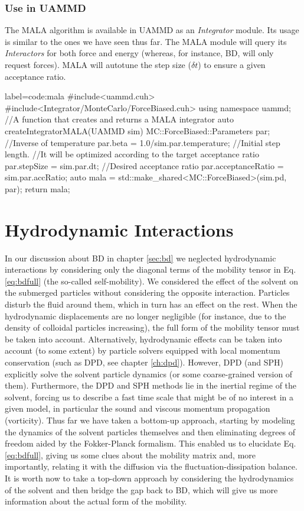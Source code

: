 \documentclass[twoside,openright,titlepage,numbers=noenddot,%
headinclude,footinclude,cleardoublepage=empty,abstract=on,
BCOR=5mm,fontsize=11pt, dvipsnames, paper=b5
]{scrreprt}
\newcommand{\uammd}{\gls{UAMMD}\xspace}
\newcommand{\dt}{\delta t}
\begin{document}
\subsection*{Use in UAMMD}
The MALA algorithm is available in \uammd as an \emph{Integrator} module. Its usage is similar to the ones we have seen thus far. The MALA module will query its \emph{Interactors} for both force and energy (whereas, for instance, \gls{BD}, will only request forces).
MALA will autotune the step size ($\dt$) to ensure a given acceptance ratio.
\begin{code2}{label=code:mala}
#include<uammd.cuh>
#include<Integrator/MonteCarlo/ForceBiased.cuh>
using namespace uammd;
//A function that creates and returns a MALA integrator
auto createIntegratorMALA(UAMMD sim){   
  MC::ForceBiased::Parameters par;
  //Inverse of temperature
  par.beta = 1.0/sim.par.temperature;	
  //Initial step length.
  //It will be optimized according to the target acceptance ratio
  par.stepSize = sim.par.dt;
  //Desired acceptance ratio 
  par.acceptanceRatio = sim.par.accRatio;
  auto mala = std::make_shared<MC::ForceBiased>(sim.pd, par);
  return mala;
}
\end{code2}

\chapter{Hydrodynamic Interactions}\label{sec:bdhi}
In our discussion about \gls{BD} in chapter \ref{sec:bd} we neglected hydrodynamic interactions by considering only the diagonal terms of the mobility tensor in Eq. \eqref{eq:bdfull} (the so-called self-mobility). We considered the effect of the solvent on the submerged particles without considering the opposite interaction. Particles disturb the fluid around them, which in turn has an effect on the rest. When the hydrodynamic displacements are no longer negligible (for instance, due to the density of colloidal particles increasing), the full form of the mobility tensor must be taken into account. Alternatively, hydrodynamic effects can be taken into account (to some extent) by particle solvers equipped with local momentum conservation (such as \gls{DPD}, see chapter \ref{ch:dpd}). However, \gls{DPD} (and \gls{SPH}) explicitly solve the solvent particle dynamics (or some coarse-grained version of them). Furthermore, the \gls{DPD} and \gls{SPH} methods lie in the inertial regime of the solvent, forcing us to describe a fast time scale that might be of no interest in a given model, in particular the sound and viscous momentum propagation (vorticity). Thus far we have taken a bottom-up approach, starting by modeling the dynamics of the solvent particles themselves and then eliminating degrees of freedom aided by the Fokker-Planck formalism. This enabled us to elucidate Eq. \eqref{eq:bdfull}, giving us some clues about the mobility matrix and, more importantly, relating it with the diffusion via the fluctuation-dissipation balance. It is worth now to take a top-down approach by considering the hydrodynamics of the solvent and then bridge the gap back to \gls{BD}, which will give us more information about the actual form of the mobility.
\end{document}
